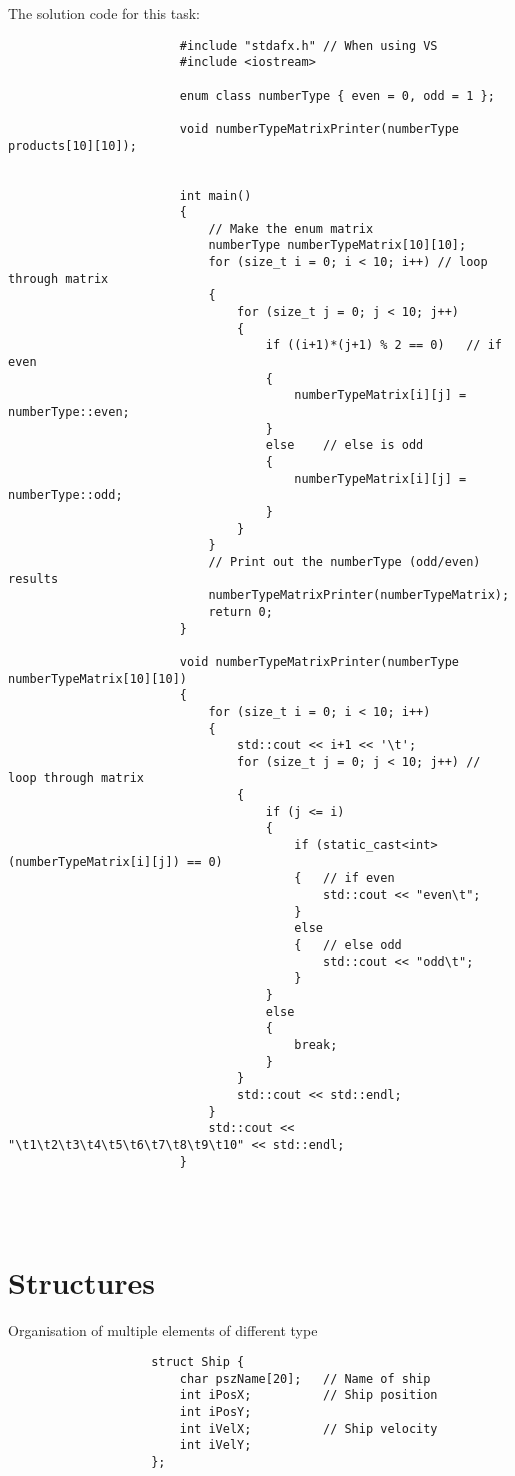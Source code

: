 \documentclass{report}
\begin{document}
				
				\begin{minipage}{\linewidth}
					The solution code for this task:
					\begin{lstlisting}
						#include "stdafx.h"	// When using VS
						#include <iostream>
						
						enum class numberType { even = 0, odd = 1 };
						
						void numberTypeMatrixPrinter(numberType products[10][10]);
						
						
						int main()
						{
							// Make the enum matrix
							numberType numberTypeMatrix[10][10];
							for (size_t i = 0; i < 10; i++)	// loop through matrix
							{
								for (size_t j = 0; j < 10; j++)
								{
									if ((i+1)*(j+1) % 2 == 0)	// if even
									{
										numberTypeMatrix[i][j] = numberType::even;
									}
									else	// else is odd
									{
										numberTypeMatrix[i][j] = numberType::odd;
									}
								}
							}
							// Print out the numberType (odd/even) results
							numberTypeMatrixPrinter(numberTypeMatrix);
							return 0;
						}
						
						void numberTypeMatrixPrinter(numberType numberTypeMatrix[10][10])
						{
							for (size_t i = 0; i < 10; i++)
							{
								std::cout << i+1 << '\t';
								for (size_t j = 0; j < 10; j++)	// loop through matrix
								{
									if (j <= i)
									{
										if (static_cast<int>(numberTypeMatrix[i][j]) == 0)
										{	// if even
											std::cout << "even\t";
										}
										else
										{	// else odd
											std::cout << "odd\t";
										}
									}
									else
									{
										break;
									}
								}
								std::cout << std::endl;
							}
							std::cout << "\t1\t2\t3\t4\t5\t6\t7\t8\t9\t10" << std::endl;
						}
					\end{lstlisting}
				\end{minipage}
				\\ \\
		
		
		
		\section{Structures}
			Organisation of multiple elements of different type \\
			
			\begin{minipage}{\linewidth}
				\begin{lstlisting}
					struct Ship {
						char pszName[20];	// Name of ship
						int iPosX;			// Ship position
						int iPosY;
						int iVelX;			// Ship velocity
						int iVelY;
					};
				\end{lstlisting}
			\end{minipage}
			\\ \\
			
\end{document}
